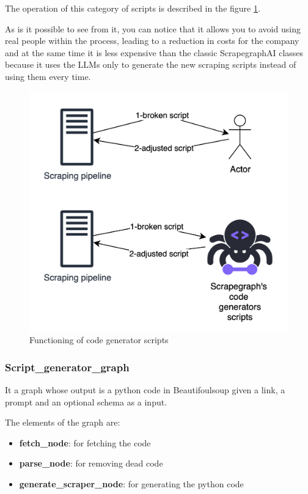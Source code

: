 The operation of this category of scripts is described in the figure \ref{fig:actually indians}.

As is it possible to see from it, you can notice that it allows you to avoid using real people within the process, leading to a reduction in costs for the company and at the same time it is less expensive than the classic ScrapegraphAI  classes because it uses the LLMs only to generate the new scraping scripts instead of using them every time.

\begin{figure}[h!]
    \centering
    \includegraphics[width=1\linewidth]{Assets/code_generator_scripts.png}
    \caption{Functioning of code generator scripts}
    \label{fig:actually indians}
\end{figure}
\subsubsection{Script\_generator\_graph}
It a graph whose output is a python code in Beautifoulsoup given a link, a prompt and an optional schema as a input.

The elements of the graph are:

\begin{itemize}
    \item \textbf{fetch\_node}: for fetching the code
    \item \textbf{parse\_node}: for removing dead code
    \item \textbf{generate\_scraper\_node}: for generating the python code
\end{itemize}

